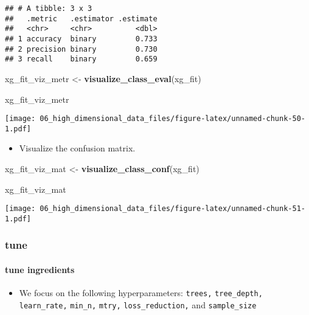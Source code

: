 \documentclass[
]{book}
\newenvironment{Shaded}{\begin{snugshade}}{\end{snugshade}}
\newcommand{\KeywordTok}[1]{\textcolor[rgb]{0.13,0.29,0.53}{\textbf{#1}}}
\newcommand{\NormalTok}[1]{#1}
\newcommand{\StringTok}[1]{\textcolor[rgb]{0.31,0.60,0.02}{#1}}
\providecommand{\tightlist}{%
  \setlength{\itemsep}{0pt}\setlength{\parskip}{0pt}}
\begin{document}
\begin{verbatim}
## # A tibble: 3 x 3
##   .metric   .estimator .estimate
##   <chr>     <chr>          <dbl>
## 1 accuracy  binary         0.733
## 2 precision binary         0.730
## 3 recall    binary         0.659
\end{verbatim}

\begin{Shaded}
\begin{Highlighting}[]
\NormalTok{xg\_fit\_viz\_metr \textless{}{-}}\StringTok{ }\KeywordTok{visualize\_class\_eval}\NormalTok{(xg\_fit)}

\NormalTok{xg\_fit\_viz\_metr}
\end{Highlighting}
\end{Shaded}

\texttt{[image: 06\_high\_dimensional\_data\_files/figure-latex/unnamed-chunk-50-1.pdf]}

\begin{itemize}
\tightlist
\item
  Visualize the confusion matrix.
\end{itemize}

\begin{Shaded}
\begin{Highlighting}[]
\NormalTok{xg\_fit\_viz\_mat \textless{}{-}}\StringTok{ }\KeywordTok{visualize\_class\_conf}\NormalTok{(xg\_fit)}

\NormalTok{xg\_fit\_viz\_mat}
\end{Highlighting}
\end{Shaded}

\texttt{[image: 06\_high\_dimensional\_data\_files/figure-latex/unnamed-chunk-51-1.pdf]}

\hypertarget{tune-3}{%
\subsubsection{tune}\label{tune-3}}

\hypertarget{tune-ingredients-3}{%
\paragraph{tune ingredients}\label{tune-ingredients-3}}

\begin{itemize}
\tightlist
\item
  We focus on the following hyperparameters: \texttt{trees,} \texttt{tree\_depth,} \texttt{learn\_rate,} \texttt{min\_n,} \texttt{mtry,} \texttt{loss\_reduction,} and \texttt{sample\_size}
\end{itemize}
\end{document}
